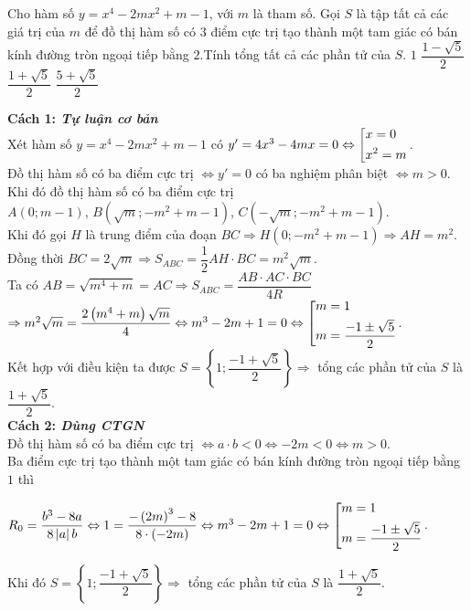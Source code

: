 \begin{vd}%
	Cho hàm số $y=x^4 - 2mx^2+m-1$, với $m$ là tham số. Gọi $S$ là tập tất cả các giá trị của $m$ để đồ thị hàm số có $3$ điểm cực trị tạo thành một tam giác có bán kính đường tròn ngoại tiếp bằng $2$.Tính tổng tất cả các phần tử của $S$.
	\choice
	{$1$}
	{$\dfrac{1 - \sqrt{5}}{2}$}
	{\True $\dfrac{1 + \sqrt{5}}{2}$}
	{$\dfrac{5 + \sqrt{5}}{2}$}
	\loigiai
	{\textbf{Cách 1: \textit{Tự luận cơ bản}}\\
		Xét hàm số $y=x^4 - 2mx^2+m-1$ có $y' = 4x^3 - 4mx = 0 \Leftrightarrow \left[\begin{aligned}&x = 0\\&x^2 = m\end{aligned}\right.$.\\
		Đồ thị hàm số có ba điểm cực trị $\Leftrightarrow y'  = 0$ có ba nghiệm phân biệt $\Leftrightarrow m > 0$.\\
		Khi đó đồ thị hàm số có ba điểm cực trị \\
		$A\left(0;m - 1\right)$, $B\left(\sqrt{m};- m^2 + m - 1\right)$, $C\left(-\sqrt{m};- m^2 + m - 1\right)$.\\
		Khi đó gọi $H$ là trung điểm của đoạn $BC \Rightarrow H\left(0;- m^2 + m - 1\right) \Rightarrow AH = m^2$.\\
		Đồng thời $BC = 2\sqrt{m} \Rightarrow S_{ABC} = \dfrac{1}{2}AH\cdot BC = m^2\sqrt{m}$.\\
		Ta có $AB = \sqrt{m^4 + m} = AC \Rightarrow S_{ABC} = \dfrac{AB\cdot AC\cdot BC}{4R}$\\
		$\Rightarrow m^2\sqrt{m} = \dfrac{2\left(m^4 + m\right)\sqrt{m}}{4} \Leftrightarrow m^3 - 2m + 1 = 0 \Leftrightarrow \left[\begin{aligned}&m = 1\\&m = \dfrac{- 1 \pm \sqrt{5}}{2}\end{aligned}\right.$. \\
		Kết hợp với điều kiện ta được $S = \left\{1;\dfrac{- 1 + \sqrt{5}}{2}\right\} \Rightarrow$ tổng các phần tử của $S$ là $\dfrac{1 + \sqrt{5}}{2}$.\\
		\textbf{Cách 2: \textit{Dùng CTGN}}\\Đồ thị hàm số có ba điểm cực trị $\Leftrightarrow a\cdot b < 0 \Leftrightarrow - 2m < 0 \Leftrightarrow m > 0$.\\
		Ba điểm cực trị tạo thành một tam giác có bán kính đường tròn ngoại tiếp bằng $1$ thì 
		\begin{center}
			$R_0 = \dfrac{b^3 - 8a}{8\left|a\right|b} \Leftrightarrow 1 = \dfrac{- \left(2m\right)^3 - 8}{8\cdot \left(- 2m\right)} \Leftrightarrow m^3 - 2m + 1 = 0 \Leftrightarrow \left[\begin{aligned}&m = 1\\&m = \dfrac{- 1 \pm \sqrt{5}}{2}\end{aligned}\right.$.\\
		\end{center}
		Khi đó $S = \left\{1;\dfrac{- 1 + \sqrt{5}}{2}\right\} \Rightarrow$ tổng các phần tử của $S$ là $\dfrac{1 + \sqrt{5}}{2}$.
	}
\end{vd}

